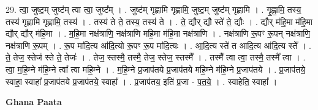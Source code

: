 \documentclass[17pt]{extarticle}
\begin{document}
29. त्वा॒ जुष्ट॒म् जुष्ट॑म् त्वा त्वा॒ जुष्ट᳚म् । . जुष्ट॑म् गृह्णामि गृह्णामि॒ जुष्ट॒म् जुष्ट॑म् गृह्णामि । . गृ॒ह्णा॒मि॒ तस्य॒ तस्य॑ गृह्णामि गृह्णामि॒ तस्य॑ । . तस्य॑ ते ते॒ तस्य॒ तस्य॑ ते । . ते॒ द्यौर् द्यौ स्ते॑ ते॒ द्यौः । . द्यौर् म॑हि॒मा म॑हि॒मा द्यौर् द्यौर् म॑हि॒मा । . म॒हि॒मा नक्ष॑त्राणि॒ नक्ष॑त्राणि महि॒मा म॑हि॒मा नक्ष॑त्राणि । . नक्ष॑त्राणि रू॒पꣳ रू॒पन् नक्ष॑त्राणि॒ नक्ष॑त्राणि रू॒पम् । . रू॒प मा॑दि॒त्य आ॑दि॒त्यो रू॒पꣳ रू॒प मा॑दि॒त्यः । . आ॒दि॒त्य स्ते॑ त आदि॒त्य आ॑दि॒त्य स्ते᳚ । . ते॒ तेज॒ स्तेज॑ स्ते ते॒ तेजः॑ । . तेज॒ स्तस्मै॒ तस्मै॒ तेज॒ स्तेज॒ स्तस्मै᳚ । . तस्मै᳚ त्वा त्वा॒ तस्मै॒ तस्मै᳚ त्वा । . त्वा॒ म॒हि॒म्ने म॑हि॒म्ने त्वा᳚ त्वा महि॒म्ने । . म॒हि॒म्ने प्र॒जाप॑तये प्र॒जाप॑तये महि॒म्ने म॑हि॒म्ने प्र॒जाप॑तये । . प्र॒जाप॑तये॒ स्वाहा॒ स्वाहा᳚ प्र॒जाप॑तये प्र॒जाप॑तये॒ स्वाहा᳚ । . प्र॒जाप॑तय॒ इति॑ प्र॒जा - प॒त॒ये॒ । . स्वाहेति॒ स्वाहा᳚ । \newline

\textbf{Ghana Paata } \newline
\end{document}
